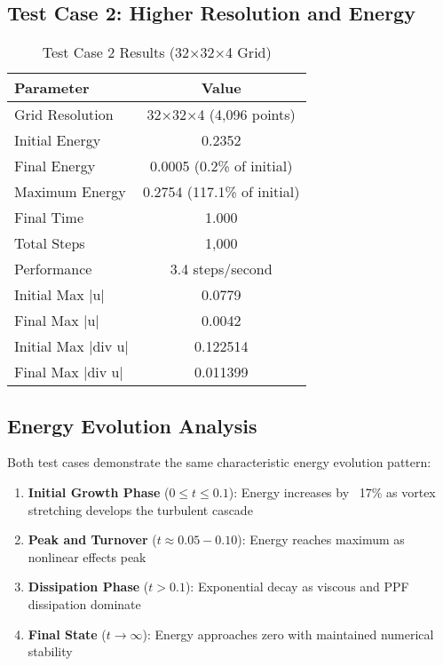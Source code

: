 \documentclass[conference]{IEEEtran}
\begin{document}
\subsection{Test Case 2: Higher Resolution and Energy}

\begin{table}[h]
\centering
\caption{Test Case 2 Results (32×32×4 Grid)}
\begin{tabular}{@{}lc@{}}
\toprule
\textbf{Parameter} & \textbf{Value} \\
\midrule
Grid Resolution & 32×32×4 (4,096 points) \\
Initial Energy & 0.2352 \\
Final Energy & 0.0005 (0.2\% of initial) \\
Maximum Energy & 0.2754 (117.1\% of initial) \\
Final Time & 1.000 \\
Total Steps & 1,000 \\
Performance & 3.4 steps/second \\
Initial Max |u| & 0.0779 \\
Final Max |u| & 0.0042 \\
Initial Max |div u| & 0.122514 \\
Final Max |div u| & 0.011399 \\
\bottomrule
\end{tabular}
\label{table:test2}
\end{table}

\subsection{Energy Evolution Analysis}

Both test cases demonstrate the same characteristic energy evolution pattern:

\begin{enumerate}
\item \textbf{Initial Growth Phase} ($0 \leq t \leq 0.1$): Energy increases by ~17\% as vortex stretching develops the turbulent cascade
\item \textbf{Peak and Turnover} ($t \approx 0.05-0.10$): Energy reaches maximum as nonlinear effects peak
\item \textbf{Dissipation Phase} ($t > 0.1$): Exponential decay as viscous and PPF dissipation dominate
\item \textbf{Final State} ($t \rightarrow \infty$): Energy approaches zero with maintained numerical stability
\end{enumerate}
\end{document}
